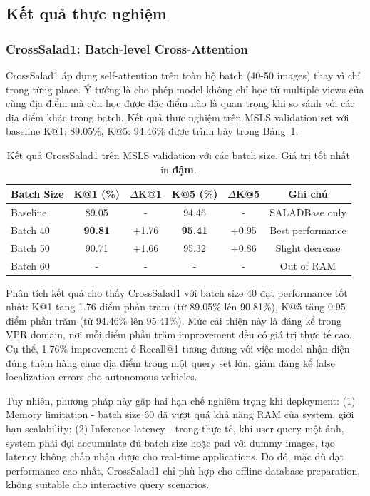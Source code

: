 \documentclass[12pt,a4paper]{article}
\begin{document}
    \subsection{Kết quả thực nghiệm}

    \subsubsection{CrossSalad1: Batch-level Cross-Attention}

    CrossSalad1 áp dụng self-attention trên toàn bộ batch (40-50 images) thay vì chỉ trong từng place. Ý tưởng là cho phép model không chỉ học từ multiple views của cùng địa điểm mà còn học được đặc điểm nào là quan trọng khi so sánh với các địa điểm khác trong batch. Kết quả thực nghiệm trên MSLS validation set với baseline K@1: 89.05\%, K@5: 94.46\% được trình bày trong Bảng~\ref{tab:crosssalad1_results}.

    \begin{table}[h]
    \centering
    \caption{Kết quả CrossSalad1 trên MSLS validation với các batch size. Giá trị tốt nhất in \textbf{đậm}.}
    \label{tab:crosssalad1_results}
    \small
    \begin{tabular}{@{}lccccc@{}}
    \toprule
    \textbf{Batch Size} & \textbf{K@1 (\%)} & \textbf{$\Delta$K@1} & \textbf{K@5 (\%)} & \textbf{$\Delta$K@5} & \textbf{Ghi chú} \\
    \midrule
    Baseline & 89.05 & - & 94.46 & - & SALADBase only \\
    Batch 40 & \textbf{90.81} & +1.76 & \textbf{95.41} & +0.95 & Best performance \\
    Batch 50 & 90.71 & +1.66 & 95.32 & +0.86 & Slight decrease \\
    Batch 60 & - & - & - & - & Out of RAM \\
    \bottomrule
    \end{tabular}
    \end{table}

    Phân tích kết quả cho thấy CrossSalad1 với batch size 40 đạt performance tốt nhất: K@1 tăng 1.76 điểm phần trăm (từ 89.05\% lên 90.81\%), K@5 tăng 0.95 điểm phần trăm (từ 94.46\% lên 95.41\%). Mức cải thiện này là đáng kể trong VPR domain, nơi mỗi điểm phần trăm improvement đều có giá trị thực tế cao. Cụ thể, 1.76\% improvement ở Recall@1 tương đương với việc model nhận diện đúng thêm hàng chục địa điểm trong một query set lớn, giảm đáng kể false localization errors cho autonomous vehicles.

    Tuy nhiên, phương pháp này gặp hai hạn chế nghiêm trọng khi deployment: (1) Memory limitation - batch size 60 đã vượt quá khả năng RAM của system, giới hạn scalability; (2) Inference latency - trong thực tế, khi user query một ảnh, system phải đợi accumulate đủ batch size hoặc pad với dummy images, tạo latency không chấp nhận được cho real-time applications. Do đó, mặc dù đạt performance cao nhất, CrossSalad1 chỉ phù hợp cho offline database preparation, không suitable cho interactive query scenarios.
\end{document}
